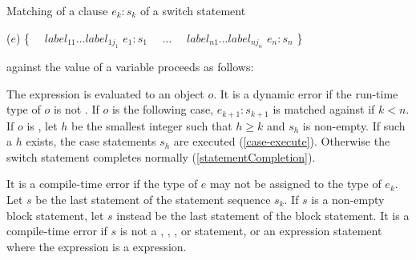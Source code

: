 \documentclass[makeidx]{article}
\begin{document}
{\LMHash{}%
Matching of a \CASE{} clause \CASE{} $e_{k}: s_{k}$ of a switch statement

\begin{normativeDartCode}
\SWITCH{} ($e$) \{
\ \ $label_{11} \ldots label_{1j_1}$ \CASE{} $e_1: s_1$
\ \ $\ldots$
\ \ $label_{n1} \ldots label_{nj_n}$ \CASE{} $e_n: s_n$
\}
\end{normativeDartCode}

\noindent
against the value of a variable \id{} proceeds as follows:

\LMHash{}%
The expression  is evaluated to an object $o$.
It is a dynamic error if the run-time type of $o$ is not .
If $o$ is \FALSE{} the following case,
\CASE{} $e_{k+1}: s_{k+1}$ is matched against \id{} if $k < n$.
If $o$ is \TRUE, let $h$ be the smallest integer
such that $h \ge k$ and $s_h$ is non-empty.
If such a $h$ exists, the case statements $s_h$ are executed
(\ref{case-execute}).
Otherwise the switch statement completes normally
(\ref{statementCompletion}).

\LMHash{}%
It is a compile-time error if the type of $e$
may not be assigned to the type of $e_k$.
Let $s$ be the last statement of the statement sequence $s_k$.
If $s$ is a non-empty block statement, let $s$ instead be
the last statement of the block statement.
It is a compile-time error if $s$ is not
a \BREAK, \CONTINUE, \RETHROW, or \RETURN{} statement,
or an expression statement where the expression is a \THROW{} expression.

}
\end{document}
